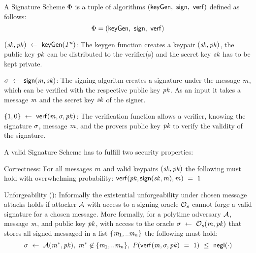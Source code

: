 
\begin{definition}\label{def:pre:signature-scheme}
    A Signature Scheme $\Phi$ is a tuple of algorithms $(\mathsf{keyGen} ,~ \mathsf{sign} ,~ \mathsf{verf})$ defined as follows:~\cite{goldwasser1988digital}
    \[ \Phi = (\mathsf{keyGen} ,~ \mathsf{sign} ,~ \mathsf{verf}) \]

    \begin{asparaitem}
        \item $(\mathit{sk}, \mathit{pk}) ~\leftarrow~ \mathsf{keyGen}(\mathit{1^n})$: The keygen function creates a keypair $(\mathit{sk}, \mathit{pk})$, the public key $\mathit{pk}$ can be distributed to the verifier(s) and the secret key $\mathit{sk}$ has to be kept private. \\
        \item $\sigma ~\leftarrow~ \mathsf{sign}(\mathit{m}, \mathit{sk})$: The signing algoritm creates a signature under the message $\mathit{m}$, which can be verified with the respective public key $\mathit{pk}$.
        As an input it takes a message $\mathit{m}$ and the secret key $\mathit{sk}$ of the signer.
        \item $\{1,0\} ~\leftarrow~ \mathsf{verf}(\mathit{m}, \sigma, \mathit{pk})$: The verification function allows a verifier, knowing the signature $\sigma$, message $\mathit{m}$, and the provers public key $\mathit{pk}$ to verify the validity of the signature.
    \end{asparaitem}

    A valid Signature Scheme has to fulfill two security properties:
    \begin{asparaitem}
        \item Correctness: For all messages $\mathit{m}$ and valid keypairs $(\mathit{sk}, \mathit{pk})$ the following must hold with overwhelming probability: $\mathsf{verf}(\mathit{pk}, \mathsf{sign}(\mathit{sk}, \mathit{m}), \mathit{m}) ~=~ 1$
        \item Unforgeability (\cnstEUFCMA): Informally the existential unforgeability under chosen message attacks holds if attacker $\mathcal{A}$ with access to a signing oracle $\mathcal{O}_{s}$ cannot forge a valid signature for a chosen message.
        More formally, for a polytime adversary $\mathcal{A}$, message $\mathit{m}$, and public key $\mathit{pk}$, with access to the oracle $\sigma ~\leftarrow~ \mathcal{O}_{s}(\mathit{m},\mathit{pk})$ that stores all signed messaged in a list $\{\mathit{m}_1,..\mathit{m}_n\}$ the following must hold:
        \[ \sigma ~\leftarrow~ \mathcal{A}(\mathit{m}^*, \mathit{pk}), \; \mathit{m}^* \not\in \{\mathit{m}_1,..\mathit{m}_n\}, \; \mathit{P}(\mathsf{verf}(\mathit{m}, \sigma, \mathit{pk}) ~=~ 1) ~\leq~ \mathsf{negl}(\cdot) \]
    \end{asparaitem}
\end{definition}

